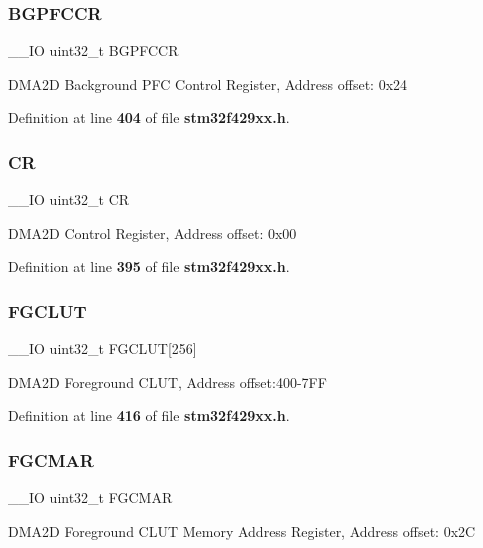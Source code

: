 \subsubsection{B\+G\+P\+F\+C\+CR}
{\footnotesize\ttfamily \+\_\+\+\_\+\+IO uint32\+\_\+t B\+G\+P\+F\+C\+CR}

D\+M\+A2D Background P\+FC Control Register, Address offset\+: 0x24 

Definition at line \textbf{ 404} of file \textbf{ stm32f429xx.\+h}.

\mbox{\label{structDMA2D__TypeDef_ab40c89c59391aaa9d9a8ec011dd0907a}} 
\subsubsection{CR}
{\footnotesize\ttfamily \+\_\+\+\_\+\+IO uint32\+\_\+t CR}

D\+M\+A2D Control Register, Address offset\+: 0x00 

Definition at line \textbf{ 395} of file \textbf{ stm32f429xx.\+h}.

\mbox{\label{structDMA2D__TypeDef_a7ed3c45a71b6382890860bcd8f313d51}} 
\subsubsection{F\+G\+C\+L\+UT}
{\footnotesize\ttfamily \+\_\+\+\_\+\+IO uint32\+\_\+t F\+G\+C\+L\+UT[256]}

D\+M\+A2D Foreground C\+L\+UT, Address offset\+:400-\/7\+FF 

Definition at line \textbf{ 416} of file \textbf{ stm32f429xx.\+h}.

\mbox{\label{structDMA2D__TypeDef_a27ad59cf99d0d0904958175238c40d8d}} 
\subsubsection{F\+G\+C\+M\+AR}
{\footnotesize\ttfamily \+\_\+\+\_\+\+IO uint32\+\_\+t F\+G\+C\+M\+AR}

D\+M\+A2D Foreground C\+L\+UT Memory Address Register, Address offset\+: 0x2C 

